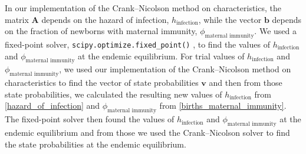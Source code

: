 \documentclass{article}
\renewcommand{\vec}[1]{\mathbf{#1}}
\newcommand{\mat}[1]{\mathbf{#1}}
\begin{document}
In our implementation of the Crank--Nicolson method on
characteristics, the matrix $\mat{A}$
depends on the hazard of infection, $h_{\text{infection}}$,
while the vector $\vec{b}$
depends on the fraction of newborns with maternal immunity,
$\phi_{\text{maternal immunity}}$.
We used a fixed-point solver, \verb|scipy.optimize.fixed_point()|
\autocite{scipy}, to find the values of $h_{\text{infection}}$
and $\phi_{\text{maternal immunity}}$ at the endemic equilibrium.
For trial values of $h_{\text{infection}}$ and
$\phi_{\text{maternal immunity}}$, we used our implementation of the
Crank--Nicolson method on characteristics to find the vector of state
probabilities $\vec{v}$ and then from those state probabilities, we
calculated the resulting new values of $h_{\text{infection}}$ from
\eqref{hazard_of_infection} and $\phi_{\text{maternal immunity}}$ from
\eqref{births_maternal_immunity}. The fixed-point solver then found
the values of $h_{\text{infection}}$ and
$\phi_{\text{maternal immunity}}$ at the endemic equilibrium and from
those we used the Crank--Nicolson solver to find the state
probabilities at the endemic equilibrium.


\printbibliography
\end{document}
